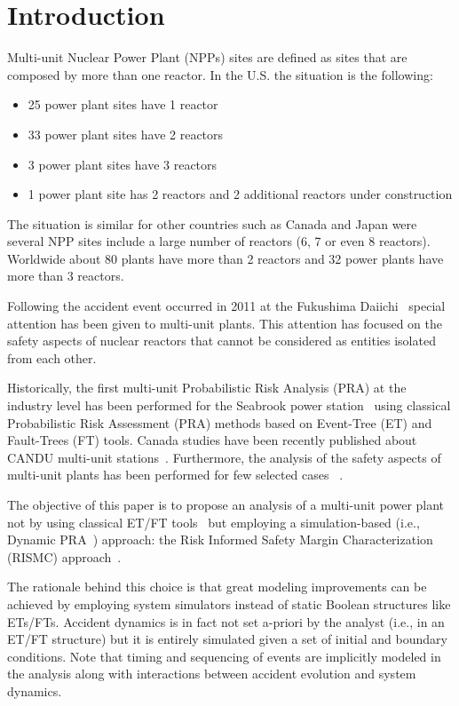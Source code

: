 \section{Introduction}
\label{sec:introduction}

Multi-unit Nuclear Power Plant (NPPs) sites are defined as sites that are composed by 
more than one reactor. In the U.S. the situation is the following:
\begin{itemize}
  \item 25 power plant sites have 1 reactor
  \item 33 power plant sites have 2 reactors
  \item 3 power plant sites have 3 reactors
  \item 1 power plant site has 2 reactors and 2 additional reactors under construction
\end{itemize}
The situation is similar for other countries such as Canada and Japan were 
several NPP sites include a large number of reactors (6, 7 or even 8 reactors). 
Worldwide about 80 plants have more than 2 reactors and 32 power plants have more 
than 3 reactors. 

Following the accident event occurred in 2011 at the Fukushima Daiichi~\cite{Fukushima} special 
attention has been given to multi-unit plants. This attention has focused on the 
safety aspects of nuclear reactors that cannot be considered as entities isolated 
from each other. 

Historically, the first multi-unit Probabilistic Risk Analysis (PRA) at the industry
level has been performed for the Seabrook power station~\cite{Seabrook_MU_PRA} using 
classical Probabilistic Risk Assessment (PRA) methods based on Event-Tree (ET) and 
Fault-Trees (FT) tools.
Canada studies have been recently published about CANDU multi-unit 
stations~\cite{CANDU_MU_PRA,Darlington_MU_PRA}.
Furthermore, the analysis of the safety aspects of multi-unit plants has been performed 
for few selected cases ~\cite{MultiUnitKumara,MultiUnitModarres,MultiUnitZhang}. 

The objective of this paper is to propose an analysis of a multi-unit power 
plant not by using classical ET/FT tools~\cite{Nureg1150} but employing a simulation-based 
(i.e., Dynamic PRA~\cite{DynamicReliabilityMonteCarlo}) approach: 
the Risk Informed Safety Margin Characterization (RISMC) approach~\cite{RISMC,mandelliNewAlgo}. 

The rationale behind this choice is that great modeling improvements can be achieved by 
employing system simulators instead of static Boolean structures like ETs/FTs. 
Accident dynamics is in fact not set a-priori by the analyst (i.e., in an ET/FT 
structure) but it is entirely simulated given a set of initial and boundary conditions. 
Note that timing and sequencing of events are implicitly modeled in the analysis along 
with interactions between accident evolution and system dynamics.

